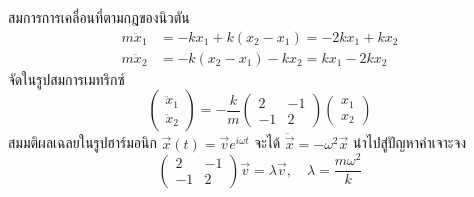 สมการการเคลื่อนที่ตามกฎของนิวตัน
\begin{align}
m \ddot{x}_1 &= -k x_1 + k(x_2 - x_1) = -2k x_1 + k x_2 \\
m \ddot{x}_2 &= -k(x_2 - x_1) - k x_2 = k x_1 - 2k x_2
\end{align}
จัดในรูปสมการเมทริกซ์
\begin{equation}
\begin{pmatrix} \ddot{x}_1 \\ \ddot{x}_2 \end{pmatrix} = -\frac{k}{m} \begin{pmatrix} 2 & -1 \\ -1 & 2 \end{pmatrix} \begin{pmatrix} x_1 \\ x_2 \end{pmatrix}
\end{equation}
สมมติผลเฉลยในรูปฮาร์มอนิก $\vec{x}(t) = \vec{v} e^{i\omega t}$ จะได้ $\ddot{\vec{x}} = -\omega^2 \vec{x}$ นำไปสู่ปัญหาค่าเจาะจง
\begin{equation}
\begin{pmatrix} 2 & -1 \\ -1 & 2 \end{pmatrix} \vec{v} = \lambda \vec{v}, \quad \lambda = \frac{m\omega^2}{k}
\end{equation}


